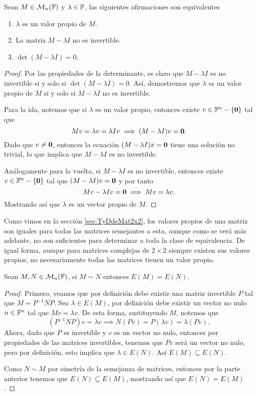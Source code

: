 \begin{teor}\label{teor:PropVP}
  Sean $M \in \mathcal{M}_n(\mathbb{F})$ y $\lambda \in \mathbb{F}$, las siguientes afirmaciones son equivalentes
  \begin{enumerate}
    \item $\lambda$ es un valor propio de $M$.
    \item La matriz $M-\lambda I$ no es invertible.
    \item $\det(M-\lambda I) = 0$.
  \end{enumerate}
\end{teor}
\begin{proof}
  Por las propiedades de la determinante, es claro que $M-\lambda I$ es no invertible si y solo si $\det(M-\lambda I)=0$. Así, demostremos que $\lambda$ es un valor propio de $M$ si y solo sí $M-\lambda I$ no es invertible.

  Para la ida, notemos que si $\lambda$ es un valor propio, entonces existe $v \in \mathbb{F}^n-\{\mathbf{0}\}$ tal que 
    \[ Mv=\lambda v = \lambda Iv \implies (M-\lambda I)v = \mathbf{0}. \]
  Dado que $v \neq \mathbf{0}$, entonces la ecuación $(M-\lambda I)x = \mathbf{0}$ tiene una solución no trivial, lo que implica que $M-\lambda I$ es no invertible.

  Análogamente para la vuelta, si $M-\lambda I$ es no invertible, entonces existe $v \in \mathbb{F}^n-\{\mathbf{0}\}$ tal que $(M-\lambda I)v = \mathbf{0}$ y por tanto
  \[ Mv - \lambda Iv = \mathbf{0} \implies Mv = \lambda v. \]
  Mostrando así que $\lambda$ es un vector propio de $M$.
\end{proof}

Como vimos en la sección \ref{sec:TyDdeMat2x2}, los valores propios de una matriz son iguales para todas las matrices semejantes a esta, aunque como se verá más adelante, no son suficientes para determinar a toda la clase de equivalencia. De igual forma, aunque para matrices complejas de $2\times 2$ siempre existen sus valores propios, no necesariamente todas las matrices tienen un valor propio.

\begin{teor}\label{teor:SemEspectro}
  Sean $M,N \in \mathcal{M}_n(\mathbb{F})$, si $M \sim N$ entonces $E(M) = E(N)$.
\end{teor}
\begin{proof}
  Primero, veamos que por definición debe existir una matriz invertible $P$ tal que $M = P^{-1} N P$. Sea $\lambda \in E(M)$, por definición debe existir un vector no nulo $n \in \mathbb{F}^n$ tal que $Mv = \lambda v$. De esta forma, sustituyendo $M$, notemos que
    \[ ( P^{-1} N P) v =  \lambda v  \implies  N(Pv) = P(\lambda v) = \lambda (Pv). \]
  Ahora, dado que $P$ es invertible y $v$ es un vector no nulo, entonces por propiedades de las matrices invertibles, tenemos que $Pv$ será un vector no nulo, pero por definición, esto implica que $\lambda \in E(N)$. Así $E(M) \subseteq E(N)$.

  Como $N \sim M$ por simetría de la semejanza de matrices, entonces por la parte anterior tenemos que $E(N) \subseteq E(M)$, mostrando así que $E(N) = E(M)$.
\end{proof}